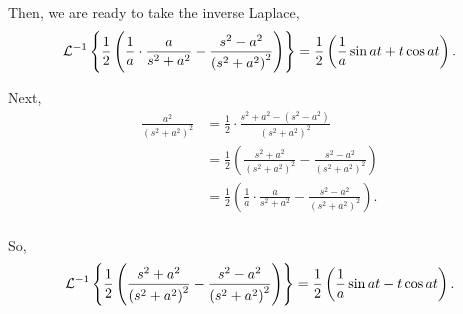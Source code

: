 \documentclass[../hw7]{subfiles}
\begin{document}
\begin{enumerate}[label= (\alph*)]
    Then, we are ready to take the inverse Laplace,
    \[\mathcal{L}^{-1}\left\{\frac{1}{2}\left( \frac{1}{a}\cdot\frac{a}{s^2+a^2}-\frac{s^2-a^2}{{\left( s^2+a^2 \right)}^2} \right)\right\}=\frac{1}{2}\left( \frac{1}{a}\sin{at}+t\cos{at} \right).\]

    Next,
    \begin{align*}
        \frac{a^2}{{\left( s^2+a^2 \right)}^2}&=\frac{1}{2}\cdot\frac{s^2+a^2-(s^2-a^2)}{{\left( s^2+a^2 \right)}^2}\\
        &=\frac{1}{2}\left( \frac{s^2+a^2}{{\left( s^2+a^2 \right)}^2}-\frac{s^2-a^2}{{\left( s^2+a^2 \right)}^2}\right)\\
        &=\frac{1}{2}\left( \frac{1}{a}\cdot\frac{a}{s^2+a^2}-\frac{s^2-a^2}{{\left( s^2+a^2 \right)}^2} \right). \\
    \end{align*}

    So, \[\mathcal{L}^{-1}\left\{\frac{1}{2}\left( \frac{s^2+a^2}{{\left( s^2+a^2 \right)}^2}-\frac{s^2-a^2}{{\left( s^2+a^2 \right)}^2}\right)\right\}=\frac{1}{2}\left( \frac{1}{a}\sin{at}-t\cos{at} \right).\]

\end{enumerate}
\end{document}
